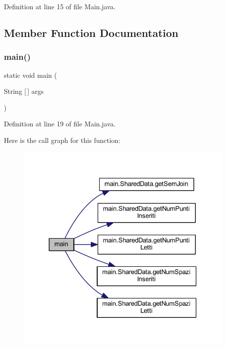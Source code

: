 Definition at line 15 of file Main.\+java.



\subsection{Member Function Documentation}
\mbox{\label{classmain_1_1_main_a8b260eecbaabcef8473fd87ada040682}} 
\subsubsection{\texorpdfstring{main()}{main()}}
{\footnotesize\ttfamily static void main (\begin{DoxyParamCaption}\item[{String \mbox{[}$\,$\mbox{]}}]{args }\end{DoxyParamCaption})\hspace{0.3cm}{\ttfamily [static]}}



Definition at line 19 of file Main.\+java.

Here is the call graph for this function\+:
\nopagebreak
\begin{figure}[H]
\begin{center}
\leavevmode
\includegraphics[width=307pt]{classmain_1_1_main_a8b260eecbaabcef8473fd87ada040682_cgraph}
\end{center}
\end{figure}


